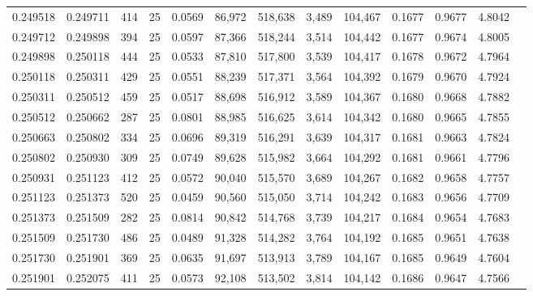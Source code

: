 \begin{tabular}{rrrrrrrrrrrrr}
0.249518 & 0.249711 &   414 &  25 &                                     0.0569 &  86,972 & 518,638 &   3,489 & 104,467 & 0.1677 & 0.9677 & 4.8042 \\
0.249712 & 0.249898 &   394 &  25 &                                     0.0597 &  87,366 & 518,244 &   3,514 & 104,442 & 0.1677 & 0.9674 & 4.8005 \\
0.249898 & 0.250118 &   444 &  25 &                                     0.0533 &  87,810 & 517,800 &   3,539 & 104,417 & 0.1678 & 0.9672 & 4.7964 \\
0.250118 & 0.250311 &   429 &  25 &                                     0.0551 &  88,239 & 517,371 &   3,564 & 104,392 & 0.1679 & 0.9670 & 4.7924 \\
0.250311 & 0.250512 &   459 &  25 &                                     0.0517 &  88,698 & 516,912 &   3,589 & 104,367 & 0.1680 & 0.9668 & 4.7882 \\
0.250512 & 0.250662 &   287 &  25 &                                     0.0801 &  88,985 & 516,625 &   3,614 & 104,342 & 0.1680 & 0.9665 & 4.7855 \\
0.250663 & 0.250802 &   334 &  25 &                                     0.0696 &  89,319 & 516,291 &   3,639 & 104,317 & 0.1681 & 0.9663 & 4.7824 \\
0.250802 & 0.250930 &   309 &  25 &                                     0.0749 &  89,628 & 515,982 &   3,664 & 104,292 & 0.1681 & 0.9661 & 4.7796 \\
0.250931 & 0.251123 &   412 &  25 &                                     0.0572 &  90,040 & 515,570 &   3,689 & 104,267 & 0.1682 & 0.9658 & 4.7757 \\
0.251123 & 0.251373 &   520 &  25 &                                     0.0459 &  90,560 & 515,050 &   3,714 & 104,242 & 0.1683 & 0.9656 & 4.7709 \\
0.251373 & 0.251509 &   282 &  25 &                                     0.0814 &  90,842 & 514,768 &   3,739 & 104,217 & 0.1684 & 0.9654 & 4.7683 \\
0.251509 & 0.251730 &   486 &  25 &                                     0.0489 &  91,328 & 514,282 &   3,764 & 104,192 & 0.1685 & 0.9651 & 4.7638 \\
0.251730 & 0.251901 &   369 &  25 &                                     0.0635 &  91,697 & 513,913 &   3,789 & 104,167 & 0.1685 & 0.9649 & 4.7604 \\
0.251901 & 0.252075 &   411 &  25 &                                     0.0573 &  92,108 & 513,502 &   3,814 & 104,142 & 0.1686 & 0.9647 & 4.7566 \\

\end{tabular}
